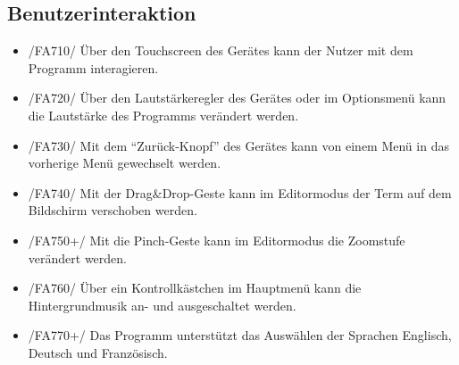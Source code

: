 \subsection{Benutzerinteraktion}

\begin{itemize}
\item /FA710/ Über den Touchscreen des Gerätes kann der Nutzer mit dem Programm interagieren.
\item /FA720/ Über den Lautstärkeregler des Gerätes oder im Optionsmenü kann die Lautstärke des Programms verändert werden.
\item /FA730/ Mit dem "`Zurück-Knopf"' des Gerätes kann von einem Menü in das vorherige Menü gewechselt werden.
\item /FA740/ Mit der Drag$\&$Drop-Geste kann im Editormodus der Term auf dem Bildschirm verschoben werden.
\item /FA750+/ Mit die Pinch-Geste kann im Editormodus die Zoomstufe verändert werden.
\item /FA760/ Über ein Kontrollkästchen im Hauptmenü kann die Hintergrundmusik an- und ausgeschaltet werden.
\item /FA770+/ Das Programm unterstützt das Auswählen der Sprachen Englisch, Deutsch und Französisch.
\end{itemize}
